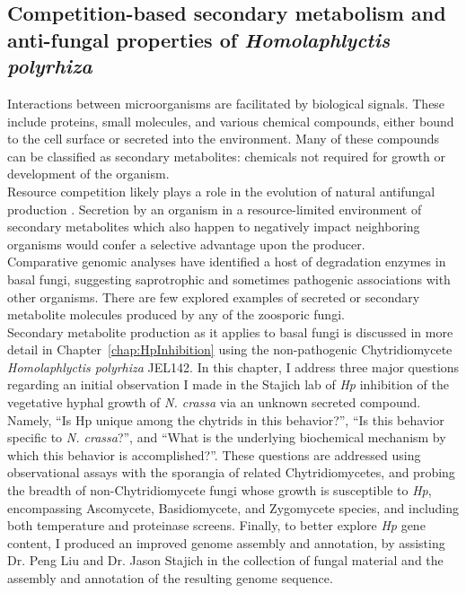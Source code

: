 \subsection*{Competition-based secondary metabolism and anti-fungal properties of \textit{Homolaphlyctis polyrhiza}}
Interactions between microorganisms are facilitated by biological signals. These include proteins, small molecules, and various chemical compounds, either bound to the cell surface or secreted into the environment. Many of these compounds can be classified as secondary metabolites: chemicals not required for growth or development of the organism.\\
\indent Resource competition likely plays a role in the evolution of natural antifungal production \cite{Vicente2003}. Secretion by an organism in a resource-limited environment of secondary metabolites which also happen to negatively impact neighboring organisms would confer a selective advantage upon the producer. \\
\indent Comparative genomic analyses have identified a host of degradation enzymes in basal fungi, suggesting saprotrophic and sometimes pathogenic associations with other organisms. There are few explored examples of secreted or secondary metabolite molecules produced by any of the zoosporic fungi.\\ 
\indent Secondary metabolite production as it applies to basal fungi is discussed in more detail in Chapter~\ref{chap:HpInhibition} using the non-pathogenic Chytridiomycete \textit{Homolaphlyctis polyrhiza} JEL142. In this chapter, I address three major questions regarding an initial observation I made in the Stajich lab of \textit{Hp} inhibition of the vegetative hyphal growth of \textit{N. crassa} via an unknown secreted compound. Namely, \enquote{Is Hp unique among the chytrids in this behavior?}, \enquote{Is this behavior specific to \textit{N. crassa}?}, and \enquote{What is the underlying biochemical mechanism by which this behavior is accomplished?}. These questions are addressed using observational assays with the sporangia of related Chytridiomycetes, and probing the breadth of non-Chytridiomycete fungi whose growth is susceptible to \textit{Hp}, encompassing Ascomycete, Basidiomycete, and Zygomycete species, and including both temperature and proteinase screens. Finally, to better explore \textit{Hp} gene content, I produced an improved genome assembly and annotation, by assisting Dr. Peng Liu and Dr. Jason Stajich in the collection of fungal material and the assembly and annotation of the resulting genome sequence.\\

